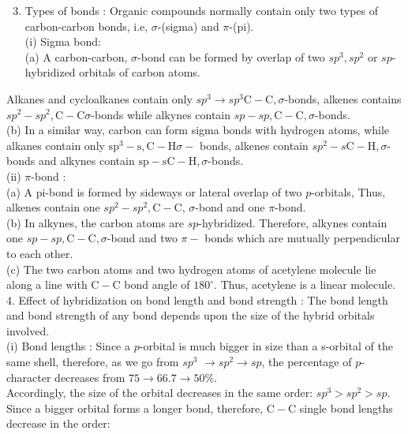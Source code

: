 \documentclass[10pt]{article}
\begin{document}
\begin{enumerate}
  \setcounter{enumi}{2}
  \item Types of bonds : Organic compounds normally contain only two types of carbon-carbon bonds, i.e, $\sigma$-(sigma) and $\pi$-(pi).\\
(i) Sigma bond:\\
(a) A carbon-carbon, $\sigma$-bond can be formed by overlap of two $s p^{3}, s p^{2}$ or $s p$-hybridized orbitals of carbon atoms.
\end{enumerate}

Alkanes and cycloalkanes contain only $s p^{3} \rightarrow s p^{3} \mathrm{C}-\mathrm{C}, \sigma$-bonds, alkenes contains $s p^{2}-s p^{2}, \mathrm{C}-\mathrm{C} \sigma$-bonds while alkynes contain $s p-s p, \mathrm{C}-\mathrm{C}, \sigma$-bonds.\\
(b) In a similar way, carbon can form sigma bonds with hydrogen atoms, while alkanes contain only $\mathrm{sp}^{3}-\mathrm{s}, \mathrm{C}-\mathrm{H} \sigma-$ bonds, alkenes contain $s p^{2}-s \mathrm{C}-\mathrm{H}, \sigma$-bonds and alkynes contain $\mathrm{sp}-\mathrm{s} \mathrm{C}-\mathrm{H}, \sigma$-bonds.\\
(ii) $\pi$-bond :\\
(a) A pi-bond is formed by sideways or lateral overlap of two $p$-orbitals, Thus, alkenes contain one $s p^{2}-s p^{2}, \mathrm{C}-\mathrm{C}$, $\sigma$-bond and one $\pi$-bond.\\
(b) In alkynes, the carbon atoms are $s p$-hybridized. Therefore, alkynes contain one $s p-s p, \mathrm{C}-\mathrm{C}, \sigma$-bond and two $\pi-$ bonds which are mutually perpendicular to each other.\\
(c) The two carbon atoms and two hydrogen atoms of acetylene molecule lie along a line with $\mathrm{C}-\mathrm{C}$ bond angle of $180^{\circ}$. Thus, acetylene is a linear molecule.\\
4. Effect of hybridization on bond length and bond strength : The bond length and bond strength of any bond depends upon the size of the hybrid orbitals involved.\\
(i) Bond lengths : Since a $p$-orbital is much bigger in size than a s-orbital of the same shell, therefore, as we go from $s p^{3}$ $\rightarrow s p^{2} \rightarrow s p$, the percentage of $p$-character decreases from $75 \rightarrow 66.7 \rightarrow 50 \%$.\\
Accordingly, the size of the orbital decreases in the same order: $s p^{3}>s p^{2}>s p$.\\
Since a bigger orbital forms a longer bond, therefore, $\mathrm{C}-\mathrm{C}$ single bond lengths decrease in the order:
\end{document}
